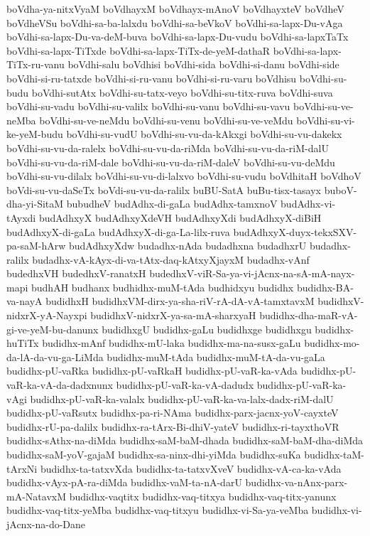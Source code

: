 {boVdha-ya-nitxVyaM
boVdhayxM
boVdhayx-mAnoV
boVdhayxteV
boVdheV
boVdheVSu
boVdhi-sa-ba-lalxdu
boVdhi-sa-beVkoV
boVdhi-sa-lapx-Du-vAga
boVdhi-sa-lapx-Du-va-deM-buva
boVdhi-sa-lapx-Du-vudu
boVdhi-sa-lapxTaTx
boVdhi-sa-lapx-TiTxde
boVdhi-sa-lapx-TiTx-de-yeM-dathaR
boVdhi-sa-lapx-TiTx-ru-vanu
boVdhi-salu
boVdhisi
boVdhi-sida
boVdhi-si-danu
boVdhi-side
boVdhi-si-ru-tatxde
boVdhi-si-ru-vanu
boVdhi-si-ru-varu
boVdhisu
boVdhi-su-budu
boVdhi-sutAtx
boVdhi-su-tatx-veyo
boVdhi-su-titx-ruva
boVdhi-suva
boVdhi-su-vadu
boVdhi-su-valilx
boVdhi-su-vanu
boVdhi-su-vavu
boVdhi-su-ve-neMba
boVdhi-su-ve-neMdu
boVdhi-su-venu
boVdhi-su-ve-veMdu
boVdhi-su-vi-ke-yeM-budu
boVdhi-su-vudU
boVdhi-su-vu-da-kAkxgi
boVdhi-su-vu-dakekx
boVdhi-su-vu-da-ralelx
boVdhi-su-vu-da-riMda
boVdhi-su-vu-da-riM-dalU
boVdhi-su-vu-da-riM-dale
boVdhi-su-vu-da-riM-daleV
boVdhi-su-vu-deMdu
boVdhi-su-vu-dilalx
boVdhi-su-vu-di-lalxvo
boVdhi-su-vudu
boVdhitaH
boVdhoV
boVdi-su-vu-daSeTx
boVdi-su-vu-da-ralilx
buBU-SatA
buBu-tisx-tasayx
buboV-dha-yi-SitaM
bubudheV
budAdhx-di-gaLa
budAdhx-tamxnoV
budAdhx-vi-tAyxdi
budAdhxyX
budAdhxyXdeVH
budAdhxyXdi
budAdhxyX-diBiH
budAdhxyX-di-gaLa
budAdhxyX-di-ga-La-lilx-ruva
budAdhxyX-duyx-tekxSXV-pa-saM-hArw
budAdhxyXdw
budadhx-nAda
budadhxna
budadhxrU
budadhx-ralilx
budadhx-vA-kAyx-di-va-tAtx-daq-kAtxyXjayxM
budadhx-vAnf
budedhxVH
budedhxV-ranatxH
budedhxV-viR-Sa-ya-vi-jAcnx-na-sA-mA-nayx-mapi
budhAH
budhanx
budhidhx-muM-tAda
budhidxyu
budidhx
budidhx-BA-va-nayA
budidhxH
budidhxVM-dirx-ya-sha-riV-rA-dA-vA-tamxtavxM
budidhxV-nidxrX-yA-Nayxpi
budidhxV-nidxrX-ya-sa-mA-sharxyaH
budidhx-dha-maR-vA-gi-ve-yeM-bu-danunx
budidhxgU
budidhx-gaLu
budidhxge
budidhxgu
budidhx-huTiTx
budidhx-mAnf
budidhx-mU-laka
budidhx-ma-na-susx-gaLu
budidhx-mo-da-lA-da-vu-ga-LiMda
budidhx-muM-tAda
budidhx-muM-tA-da-vu-gaLa
budidhx-pU-vaRka
budidhx-pU-vaRkaH
budidhx-pU-vaR-ka-vAda
budidhx-pU-vaR-ka-vA-da-dadxnunx
budidhx-pU-vaR-ka-vA-dadudx
budidhx-pU-vaR-ka-vAgi
budidhx-pU-vaR-ka-valalx
budidhx-pU-vaR-ka-va-lalx-dadx-riM-dalU
budidhx-pU-vaRsutx
budidhx-pa-ri-NAma
budidhx-parx-jacnx-yoV-cayxteV
budidhx-rU-pa-dalilx
budidhx-ra-tArx-Bi-dhiV-yateV
budidhx-ri-tayxthoVR
budidhx-sAthx-na-diMda
budidhx-saM-baM-dhada
budidhx-saM-baM-dha-diMda
budidhx-saM-yoV-gajaM
budidhx-sa-ninx-dhi-yiMda
budidhx-suKa
budidhx-taM-tArxNi
budidhx-ta-tatxvXda
budidhx-ta-tatxvXveV
budidhx-vA-ca-ka-vAda
budidhx-vAyx-pA-ra-diMda
budidhx-vaM-ta-nA-darU
budidhx-va-nAnx-parx-mA-NatavxM
budidhx-vaqtitx
budidhx-vaq-titxya
budidhx-vaq-titx-yanunx
budidhx-vaq-titx-yeMba
budidhx-vaq-titxyu
budidhx-vi-Sa-ya-veMba
budidhx-vi-jAcnx-na-do-Dane
}
